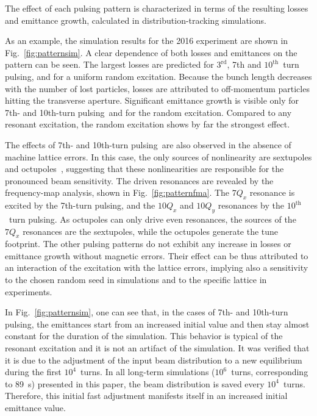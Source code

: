 \documentclass[%
 reprint,
 amsmath,amssymb,
 aps,
prstab,
longbibliography
]{revtex4-1}
\newcommand{\seventhtp}{7th-turn pulsing}
\newcommand{\tenthtp}{10th-turn pulsing}
\begin{document}
The effect of each pulsing pattern is characterized in terms of the
resulting losses and emittance growth, calculated in
distribution-tracking simulations.

As an example, the simulation results for the 2016 experiment are
shown in Fig.~\ref{fig:patternsim}.  A clear dependence of both losses
and emittances on the pattern can be seen.  The largest losses are
predicted for $3^{\mathrm{rd}}$, 7th and
$10^{\mathrm{th}}$~turn pulsing, and for a uniform random
excitation. Because the bunch length decreases with the number of lost
particles, losses are attributed to off-momentum particles hitting the
transverse aperture. Significant emittance growth is visible only for
7th- and \tenthtp\ and for the
random excitation. Compared to any resonant excitation, the random
excitation shows by far the strongest effect.

The effects of 7th- and \tenthtp\ are also observed in the absence of
machine lattice errors. In this case, the only sources of nonlinearity
are sextupoles and octupoles~\cite{md_sim_hel_res_ex_fitterer},
suggesting that these nonlinearities are responsible for the
pronounced beam sensitivity. The driven resonances are revealed by the
frequency-map analysis, shown in Fig.~\ref{fig:patternfma}. The
$7 Q_x$ resonance is excited by the \seventhtp, and the $10 Q_x$ and
$10 Q_y$ resonances by the $10^{\mathrm{th}}$~turn pulsing. As
octupoles can only drive even resonances, the sources of the $7 Q_x$
resonances are the sextupoles, while the octupoles generate the tune
footprint. The other pulsing patterns do not exhibit any increase in
losses or emittance growth without magnetic errors. Their effect can
be thus attributed to an interaction of the excitation with the
lattice errors, implying also a sensitivity to the chosen random seed
in simulations and to the specific lattice in experiments.

In Fig.~\ref{fig:patternsim}, one can see that, in the cases of 7th-
and \tenthtp, the emittances start from an increased initial value and
then stay almost constant for the duration of the simulation. This
behavior is typical of the resonant excitation and it is not an
artifact of the simulation. It was verified that it is due to the
adjustment of the input beam distribution to a new equilibrium during
the first $10^4$~turns. In all long-term simulations ($10^6$~turns,
corresponding to 89~s) presented in this paper, the beam distribution
is saved every $10^4$~turns. Therefore, this initial fast adjustment
manifests itself in an increased initial emittance value.
\end{document}
